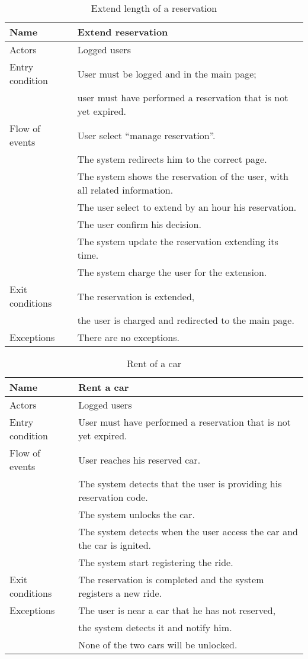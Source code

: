 \documentclass[10pt, a4paper,titlepage]{article}
\begin{document}
\begin{table}[h]
\caption{Extend length of a reservation} \label{tab:scenario6}
\begin{tabular}{|l|l|}
\hline
Name & Extend reservation \\
\hline
Actors & Logged users \\
\hline
Entry condition &  User must be logged and in the main page;\\
& user must have performed a reservation that is not yet expired. \\
\hline
Flow of events & User select “manage reservation”.\\
& The system redirects him to the correct page.\\
& The system shows the reservation of the user, with all related information.\\
& The user select to extend by an hour his reservation.\\
& The user confirm his decision.\\
& The system update the reservation extending its time.\\
& The system charge the user for the extension.\\
\hline
Exit conditions & The reservation  is extended,\\
& the user is charged and redirected to the main page.\\
\hline
Exceptions & There are no exceptions.\\
\hline
\end{tabular}
\end{table}
\begin{table}[h]
\caption{Rent of a car} \label{tab:scenario7}
\begin{tabular}{|l|l|}
\hline
Name & Rent a car \\
\hline
Actors & Logged users \\
\hline
Entry condition &  User must have performed a reservation that is not yet expired. \\
\hline
Flow of events & User reaches his reserved car.\\
& The system detects that the user is providing his reservation code.\\
& The system unlocks the car.\\
& The system detects when the user access the car and the car is ignited.\\
& The system start registering the ride.\\
\hline
Exit conditions & The reservation is completed and the system registers a new ride.\\
\hline
Exceptions & The user is near a car that he has not reserved,\\
& the system detects it and notify him.\\
& None of the two cars will be unlocked.\\
\hline
\end{tabular}
\end{table}
\end{document}
